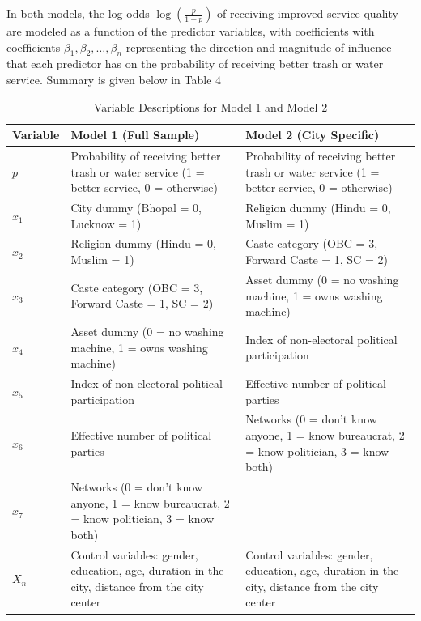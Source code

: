In both models, the log-odds \( \log \left( \frac{p}{1 - p} \right) \) of receiving improved service quality are modeled as a function of the predictor variables, with coefficients with coefficients \( \beta_1, \beta_2, \dots, \beta_n \) representing the direction and magnitude of influence that each predictor has on the probability of receiving better trash or water service. Summary is given below in Table 4
\begin{table}[H]
\centering
\caption{Variable Descriptions for Model 1 and Model 2}  %
\footnotesize  %
\begin{tabular}{|p{2cm}|p{6.5cm}|p{6.5cm}|}  %
\hline
\textbf{Variable}   & \textbf{Model 1 (Full Sample)} & \textbf{Model 2 (City Specific)} \\ \hline
\( p \)            & Probability of receiving better trash or water service (1 = better service, 0 = otherwise) & Probability of receiving better trash or water service (1 = better service, 0 = otherwise) \\ \hline
\( x_1 \)          & City dummy (Bhopal = 0, Lucknow = 1) & Religion dummy (Hindu = 0, Muslim = 1) \\ \hline
\( x_2 \)          & Religion dummy (Hindu = 0, Muslim = 1) & Caste category (OBC = 3, Forward Caste = 1, SC = 2) \\ \hline
\( x_3 \)          & Caste category (OBC = 3, Forward Caste = 1, SC = 2) & Asset dummy (0 = no washing machine, 1 = owns washing machine) \\ \hline
\( x_4 \)          & Asset dummy (0 = no washing machine, 1 = owns washing machine) & Index of non-electoral political participation \\ \hline
\( x_5 \)          & Index of non-electoral political participation & Effective number of political parties \\ \hline
\( x_6 \)          & Effective number of political parties & Networks (0 = don’t know anyone, 1 = know bureaucrat, 2 = know politician, 3 = know both) \\ \hline
\( x_7 \)          & Networks (0 = don’t know anyone, 1 = know bureaucrat, 2 = know politician, 3 = know both) &  \\ \hline
\( X_n \)          & Control variables: gender, education, age, duration in the city, distance from the city center & Control variables: gender, education, age, duration in the city, distance from the city center \\ \hline
\end{tabular}
\end{table}


